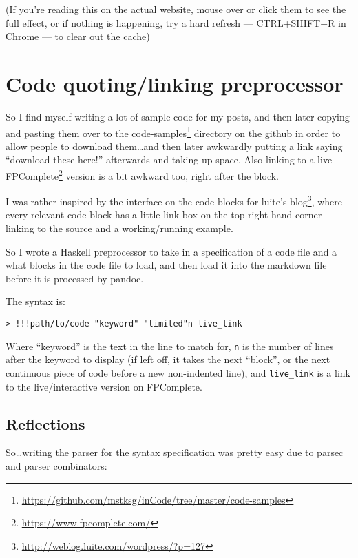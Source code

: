 \documentclass[]{article}
\renewcommand{\href}[2]{#2\footnote{\url{#1}}}
\begin{document}
(If you're reading this on the actual website, mouse over or click them to see
the full effect, or if nothing is happening, try a hard refresh --- CTRL+SHIFT+R
in Chrome --- to clear out the cache)

\section{Code quoting/linking
preprocessor}\label{code-quotinglinking-preprocessor}

So I find myself writing a lot of sample code for my posts, and then later
copying and pasting them over to the
\href{https://github.com/mstksg/inCode/tree/master/code-samples}{code-samples}
directory on the github in order to allow people to download them\ldots{}and
then later awkwardly putting a link saying ``download these here!'' afterwards
and taking up space. Also linking to a live
\href{https://www.fpcomplete.com/}{FPComplete} version is a bit awkward too,
right after the block.

I was rather inspired by the interface on the code blocks for
\href{http://weblog.luite.com/wordpress/?p=127}{luite's blog}, where every
relevant code block has a little link box on the top right hand corner linking
to the source and a working/running example.

So I wrote a Haskell preprocessor to take in a specification of a code file and
a what blocks in the code file to load, and then load it into the markdown file
before it is processed by pandoc.

The syntax is:

\begin{verbatim}
> !!!path/to/code "keyword" "limited"n live_link
\end{verbatim}

Where ``keyword'' is the text in the line to match for, \texttt{n} is the number
of lines after the keyword to display (if left off, it takes the next ``block'',
or the next continuous piece of code before a new non-indented line), and
\texttt{live\_link} is a link to the live/interactive version on FPComplete.

\subsection{Reflections}\label{reflections}

So\ldots{}writing the parser for the syntax specification was pretty easy due to
parsec and parser combinators:
\end{document}
